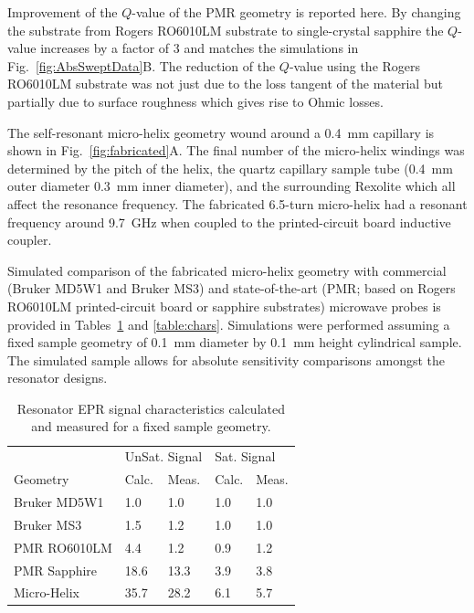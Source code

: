 Improvement of the $Q$-value of the PMR geometry is reported here. By changing the substrate from Rogers RO6010LM substrate to single-crystal sapphire the $Q$-value increases by a factor of 3 and matches the simulations in Fig.~\ref{fig:AbsSweptData}B. The reduction of the $Q$-value using the Rogers RO6010LM substrate was not just due to the loss tangent of the material but partially due to surface roughness which gives rise to Ohmic losses.

The self-resonant micro-helix geometry wound around a 0.4~mm capillary is shown in Fig.~\ref{fig:fabricated}A. The final number of the micro-helix windings was determined by the pitch of the helix, the quartz capillary sample tube (0.4~mm outer diameter 0.3~mm inner diameter), and the surrounding Rexolite which all affect the resonance frequency. The fabricated 6.5-turn micro-helix had a resonant frequency around 9.7~GHz when coupled to the printed-circuit board inductive coupler. 

Simulated comparison of the fabricated micro-helix geometry with commercial (Bruker MD5W1 and Bruker MS3) and state-of-the-art (PMR; based on Rogers RO6010LM printed-circuit board or sapphire substrates) microwave probes is provided in Tables~\ref{table:signal} and \ref{table:chars}. Simulations were performed assuming a fixed sample geometry of 0.1~mm diameter by 0.1~mm height cylindrical sample. The simulated sample allows for absolute sensitivity comparisons amongst the resonator designs. 

\begin{table}[htb]
\centering
\caption[Resonator EPR signal characteristics calculated and measured.]{Resonator EPR signal characteristics calculated and measured for a fixed sample geometry.}
\label{table:signal}
\begin{tabular}{l|l|l|l|l}
 & \multicolumn{2}{l|}{UnSat. Signal} & \multicolumn{2}{l}{Sat. Signal}\\
Geometry & Calc. & Meas. & Calc. & Meas.\\ \hline \hline
Bruker MD5W1 & 1.0 & 1.0 & 1.0 & 1.0 \\ \hline
Bruker MS3 & 1.5 & 1.2 & 1.0 & 1.0 \\ \hline
PMR RO6010LM & 4.4 & 1.2 & 0.9 & 1.2 \\ \hline
PMR Sapphire & 18.6 & 13.3 & 3.9 & 3.8 \\ \hline
Micro-Helix & 35.7 & 28.2 & 6.1 & 5.7 \\
\end{tabular}
\end{table}

